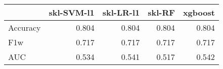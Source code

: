 \begin{tabular}{lrrrr}
\toprule
{} &  skl-SVM-l1 &  skl-LR-l1 &  skl-RF &  xgboost \\
\midrule
Accuracy &       0.804 &      0.804 &   0.804 &    0.804 \\
F1w      &       0.717 &      0.717 &   0.717 &    0.717 \\
AUC      &       0.534 &      0.541 &   0.517 &    0.542 \\
\bottomrule
\end{tabular}
